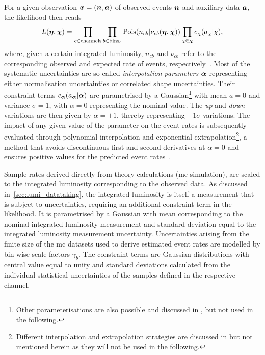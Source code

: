 For a given observation $\makemebold{x} = (\makemebold{n},\makemebold{a})$ of observed events $\makemebold{n}$ and auxiliary data $\makemebold{a}$, the likelihood then reads
\begin{equation}
	L (\makemebold{\eta}, \makemebold{\chi}) = \prod_{c\in\mathrm{channels}} \prod_{b\in\mathrm{bins_c}} \mathrm{Pois}(n_{cb}\vert\nu_{cb}(\makemebold{\eta},\makemebold{\chi})) \prod_{\chi\in\makemebold{\chi}}c_\chi (a_\chi\vert\chi),
\end{equation}
where, given a certain integrated luminosity, $n_{cb}$ and $\nu_{cb}$ refer to the corresponding observed and expected rate of events, respectively~\cite{ATL-PHYS-PUB-2019-029}.
Most of the systematic uncertainties are so-called \textit{interpolation parameters} $\makemebold{\alpha}$ representing either normalisation uncertainties or correlated shape uncertainties.
Their constraint terms $c_{\makemebold{\alpha}}(a_{\makemebold{\alpha}}\vert\makemebold{\alpha})$ are parametrised by a Gaussian\footnote{Other parameterisations are also possible and discussed in \cite{Cranmer:1456844}, but not used in the following.} with mean $a = 0$ and variance $\sigma = 1$, with $\alpha = 0$ representing the nominal value.
The \textit{up} and \textit{down} variations are then given by $\alpha=\pm 1$, thereby representing $\pm 1\sigma$ variations.
The impact of any given value of the parameter on the event rates is subsequently evaluated through polynomial interpolation and exponential extrapolation\footnote{Different interpolation and extrapolation strategies are discussed in \cite{Cranmer:1456844} but not mentioned herein as they will not be used in the following.}, a method that avoids discontinuous first and second derivatives at $\alpha = 0$ and ensures positive values for the predicted event rates~\cite{Cranmer:1456844}.

Sample rates derived directly from theory calculations (\ie \gls{mc} simulation), are scaled to the integrated luminosity corresponding to the observed data.
As discussed in~\cref{sec:lumi_datataking}, the integrated luminosity is itself a measurement that is subject to uncertainties, requiring an additional constraint term in the likelihood.
It is parametrised by a Gaussian with mean corresponding to the nominal integrated luminosity measurement and standard deviation equal to the integrated luminosity measurement uncertainty.
Uncertainties arising from the finite size of the \gls{mc} datasets used to derive estimated event rates are modelled by bin-wise scale factors $\gamma_b$.
The constraint terms are Gaussian distributions with central value equal to unity and standard deviations calculated from the individual statistical uncertainties of the samples defined in the respective channel.

